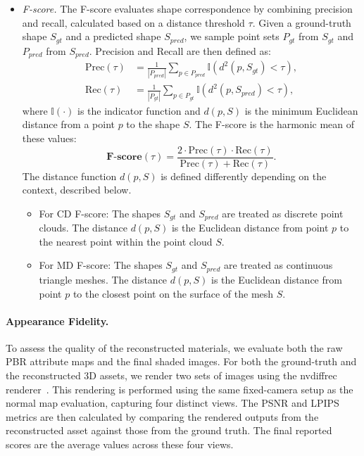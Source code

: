 \documentclass[10pt,twocolumn,letterpaper]{article}
\newcommand{\paravspace}{\vspace{-11pt}}
\begin{document}
\begin{itemize}[leftmargin=2em]
    \item \emph{F-score.} The F-score evaluates shape correspondence by combining precision and recall, calculated based on a distance threshold $\tau$. Given a ground-truth shape $S_{gt}$ and a predicted shape $S_{pred}$, we sample point sets $P_{gt}$ from $S_{gt}$ and $P_{pred}$ from $S_{pred}$. Precision and Recall are then defined as:
    \begin{equation}
    \begin{split}
        \text{Prec}(\tau) &= \frac{1}{|P_{pred}|} \sum_{p \in P_{pred}} \mathbb{I}\left( d^2(p, S_{gt}) < \tau \right), \\
        \text{Rec}(\tau) &= \frac{1}{|P_{gt}|} \sum_{p \in P_{gt}} \mathbb{I}\left( d^2(p, S_{pred}) < \tau \right),
    \end{split}
    \end{equation}
    where $\mathbb{I}(\cdot)$ is the indicator function and $d(p, S)$ is the minimum Euclidean distance from a point $p$ to the shape $S$. The F-score is the harmonic mean of these values:
    \begin{equation}
        \mathbf{F\text{-score}}(\tau) = \frac{2 \cdot \text{Prec}(\tau) \cdot \text{Rec}(\tau)}{\text{Prec}(\tau) + \text{Rec}(\tau)}.
    \end{equation}
    The distance function $d(p, S)$ is defined differently depending on the context, described below.
    \begin{itemize}
        \item For CD F-score: The shapes $S_{gt}$ and $S_{pred}$ are treated as discrete point clouds. The distance $d(p, S)$ is the Euclidean distance from point $p$ to the nearest point within the point cloud $S$.
        \item For MD F-score: The shapes $S_{gt}$ and $S_{pred}$ are treated as continuous triangle meshes. The distance $d(p, S)$ is the Euclidean distance from point $p$ to the closest point on the surface of the mesh $S$.
    \end{itemize}
\end{itemize}



\paravspace
\paragraph{Appearance Fidelity.}
To assess the quality of the reconstructed materials, we evaluate both the raw PBR attribute maps and the final shaded images. For both the ground-truth and the reconstructed 3D assets, we render two sets of images using the nvdiffrec renderer~\cite{munkberg2022extracting}. This rendering is performed using the same fixed-camera setup as the normal map evaluation, capturing four distinct views. The PSNR and LPIPS metrics are then calculated by comparing the rendered outputs from the reconstructed asset against those from the ground truth. The final reported scores are the average values across these four views.
\end{document}
